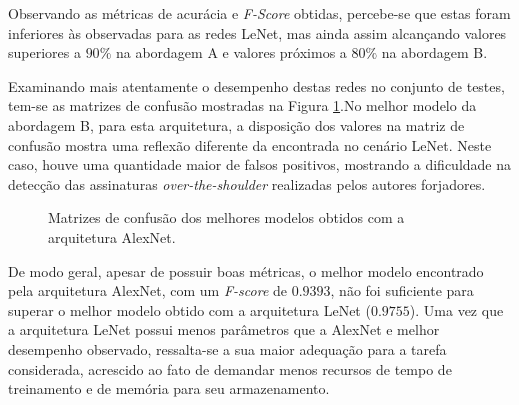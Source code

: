 Observando as métricas de acurácia e \emph{F-Score} obtidas, percebe-se que estas foram inferiores às observadas para as redes LeNet, mas ainda assim alcançando valores superiores a $90\%$ na abordagem A e valores próximos a $80\%$ na abordagem B. 

Examinando mais atentamente o desempenho destas redes no conjunto de testes, tem-se as matrizes de confusão mostradas na Figura \ref{fig:matrizes-alexnet}.No melhor modelo da abordagem B, para esta arquitetura, a disposição dos valores na matriz de confusão mostra uma reflexão diferente da encontrada no cenário LeNet. Neste caso, houve uma quantidade maior de falsos positivos, mostrando a dificuldade na detecção das assinaturas \emph{over-the-shoulder} realizadas pelos autores forjadores.

\begin{figure}[H]
 \centering
 \caption{Matrizes de confusão dos melhores modelos obtidos com a arquitetura AlexNet.}
 \hfill
 \label{fig:matrizes-alexnet}
\end{figure}

De modo geral, apesar de possuir boas métricas, o melhor modelo encontrado pela arquitetura AlexNet, com um \emph{F-score} de $0.9393$, não foi suficiente para superar o melhor modelo obtido com a arquitetura LeNet ($0.9755$). Uma vez que a arquitetura LeNet possui menos parâmetros que a AlexNet e melhor desempenho observado, ressalta-se a sua maior adequação para a tarefa considerada, acrescido ao fato de demandar menos recursos de tempo de treinamento e de memória para seu armazenamento.
